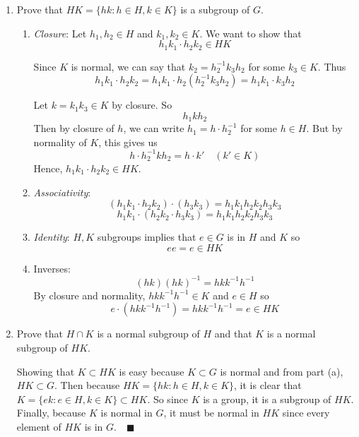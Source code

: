 \documentclass[12pt]{article}
\newcommand{\qed}{\quad \blacksquare}
\begin{document}
\begin{enumerate}[label=(\alph*)]
    \item Prove that $HK = \{hk : h \in H, k \in K\}$ is a subgroup of $G$.
    
        \color{blue}
            \begin{enumerate}
                \item \emph{Closure}: Let $h_1, h_2 \in H$ and $k_1, k_2 \in K$. We want to show that 
                \[h_1k_1 \cdot h_2 k_2 \in HK\]

                Since $K$ is normal, we can say that $k_2= h_2^{-1}k_3h_2$ for some $k_3 \in K$. Thus
                \[h_1k_1\cdot h_2k_2 = h_1k_1\cdot h_2(h_2^{-1}k_3h_2) = h_1k_1\cdot k_3h_2\]

                Let $k = k_1k_3 \in K$ by closure. So 
                \[h_1kh_2\]
                Then by closure of $h$, we can write $h_1 = h\cdot h_2^{-1}$ for some $h \in H$. But by normality of $K$, this gives us 
                \[h\cdot h_2^{-1}kh_2 = h\cdot k' \quad (k'\in K)\]
                Hence, $h_1k_1 \cdot h_2k_2 \in HK$. 

                \item \emph{Associativity}:
                \[(h_1k_1 \cdot h_2k_2)\cdot (h_3k_3) = h_1k_1h_2k_2h_3k_3\]
                \[h_1k_1 \cdot (h_2k_2\cdot h_3k_3) = h_1k_1h_2k_2h_3k_3\]
                
                \item \emph{Identity}: $H, K$ subgroups implies that $e \in G$ is in $H$ and $K$ so 
                \[ee = e \in HK\] 
                
                \item Inverses: 
                \[(hk)(hk)^{-1} = hkk^{-1}h^{-1}\]
                By closure and normality, $hkk^{-1}h^{-1} \in K$ and $e\in H$ so 
                \[e \cdot (hkk^{-1}h^{-1}) = hkk^{-1}h^{-1} = e \in HK\]
            \end{enumerate}
        \color{black}

    \item Prove that $H \cap K$ is a normal subgroup of $H$ and that $K$ is a normal subgroup of $HK$.
    
        \color{blue}
            Showing that $K \subset HK$ is easy because $K \subset G$ is normal and from part (a), $HK \subset G$. Then because $HK = \{hk: h\in H, k \in K\}$, it is clear that $K = \{ek : e\in H, k\in K\} \subset HK$. So since $K$ is a group, it is a subgroup of $HK$. Finally, because $K$ is normal in $G$, it must be normal in $HK$ since every element of $HK$ is in $G. \qed$


\end{enumerate}
\end{document}
